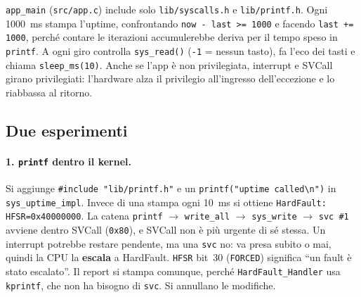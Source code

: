 \texttt{app\_main} (\texttt{src/app.c}) include solo \texttt{lib/syscalls.h} e \texttt{lib/printf.h}. Ogni 1000~ms stampa l'uptime, confrontando \texttt{now - last >= 1000} e facendo \texttt{last += 1000}, perché contare le iterazioni accumulerebbe deriva per il tempo speso in \texttt{printf}. A ogni giro controlla \texttt{sys\_read()} (\texttt{-1} = nessun tasto), fa l'eco dei tasti e chiama \texttt{sleep\_ms(10)}. Anche se l'app è non privilegiata, interrupt e SVCall girano privilegiati: l'hardware alza il privilegio all'ingresso dell'eccezione e lo riabbassa al ritorno.
 
\subsection*{Due esperimenti}
\paragraph*{1. \texttt{printf} dentro il kernel.} Si aggiunge \texttt{\#include "lib/printf.h"} e un \texttt{printf("uptime called\textbackslash n")} in \texttt{sys\_uptime\_impl}. Invece di una stampa ogni 10~ms si ottiene \texttt{HardFault: HFSR=0x40000000}. La catena \texttt{printf} $\rightarrow$ \texttt{write\_all} $\rightarrow$ \texttt{sys\_write} $\rightarrow$ \texttt{svc \#1} avviene dentro SVCall (\texttt{0x80}), e SVCall non è più urgente di sé stessa. Un interrupt potrebbe restare pendente, ma una \texttt{svc} no: va presa subito o mai, quindi la CPU la \textbf{escala} a HardFault. \texttt{HFSR} bit~30 (\texttt{FORCED}) significa ``un fault è stato escalato''. Il report si stampa comunque, perché \texttt{HardFault\_Handler} usa \texttt{kprintf}, che non ha bisogno di \texttt{svc}. Si annullano le modifiche.
 
